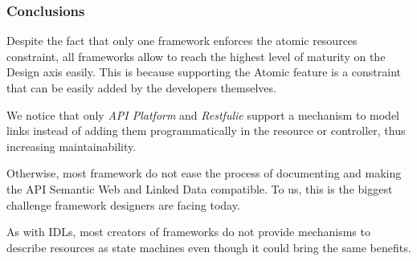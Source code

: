 \subsubsection*{Conclusions}

Despite the fact that only one framework enforces the atomic resources constraint, all frameworks allow to reach the highest level of maturity on the Design axis easily. This is because supporting the Atomic feature is a constraint that can be easily added by the developers themselves. 

We notice that only \textit{API Platform} and \textit{Restfulie} support a mechanism to model links instead of adding them programmatically in the resource or controller, thus increasing maintainability.

Otherwise, most framework do not ease the process of documenting and making the API Semantic Web and Linked Data compatible. To us, this is the biggest challenge framework designers are facing today.

As with IDLs, most creators of frameworks do not provide mechanisms to describe resources as state machines even though it could bring the same benefits. %
